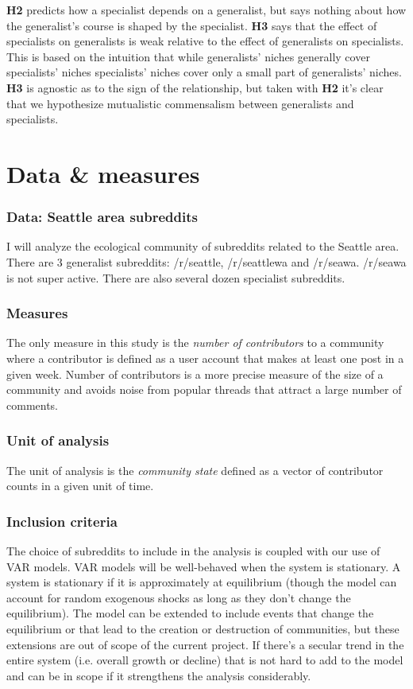 \documentclass[12pt]{memoir}
\begin{document}
\textbf{H2} predicts how a specialist depends on a generalist, but says nothing about how the generalist's course is shaped by the specialist.    \textbf{H3} says that the effect of specialists on generalists is weak relative to the effect of generalists on specialists.  This is based on the intuition that while generalists' niches generally cover specialists' niches specialists' niches cover only a small part of generalists' niches.  \textbf{H3} is agnostic as to the sign of the relationship, but taken with \textbf{H2} it's clear that we hypothesize mutualistic commensalism between generalists and specialists.

\section{Data \& measures}

\subsubsection{Data: Seattle area subreddits}

I will analyze the ecological community of subreddits related to the Seattle area.  There are 3 generalist subreddits: /r/seattle, /r/seattlewa and /r/seawa. /r/seawa is not super active.  There are also several dozen specialist subreddits.

 \subsubsection{Measures}
 The only measure in this study is the \emph{number of contributors} to a community where a contributor is defined as a user account that makes at least one post in a given week. Number of contributors is a more precise measure of the size of a community and avoids noise from popular threads that attract a large number of comments. 

 \subsubsection{Unit of analysis}
 
The unit of analysis is the \emph{community state} defined as a vector of contributor counts in a given unit of time. 

\subsubsection{Inclusion criteria}
The choice of subreddits to include in the analysis is coupled with our use of VAR models.  VAR models will be well-behaved when the system is stationary.  A system is stationary if it is approximately at equilibrium (though the model can account for random exogenous shocks as long as they don't change the equilibrium).  The model can be extended to include events that change the equilibrium or that lead to the creation or destruction of communities, but these extensions are out of scope of the current project.  If there's a secular trend in the entire system (i.e. overall growth or decline) that is not hard to add to the model and can be in scope if it strengthens the analysis considerably. 
\end{document}
